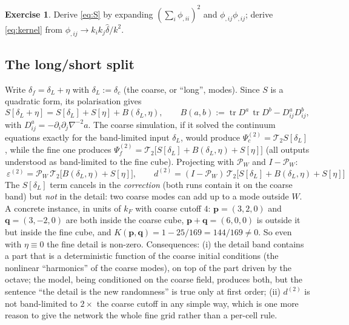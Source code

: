 \documentclass[11pt]{article}
\theoremstyle{definition}
\newtheorem{exercise}[proposition]{Exercise}
\newcommand{\PW}{\mathcal{P}_W}
\newcommand{\tr}{\operatorname{tr}}
\begin{document}
\begin{exercise}
Derive \eqref{eq:S} by expanding $(\sum_i\phi_{,ii})^2$ and $\phi_{,ij}\phi_{,ij}$; derive \eqref{eq:kernel} from $\phi_{,ij}\to k_ik_j\hat\delta/k^2$.
\end{exercise}

\subsection{The long/short split}

Write $\delta_f=\delta_L+\eta$ with $\delta_L:=\delta_c$ (the coarse, or ``long'', modes). Since $S$ is a quadratic form, its polarisation gives
\begin{equation}
S[\delta_L+\eta]=S[\delta_L]+S[\eta]+B(\delta_L,\eta),\qquad
B(a,b):=\tr D^{a}\,\tr D^{b}-D^{a}_{ij}D^{b}_{ij},
\label{eq:split}
\end{equation}
with $D^a_{ij}=-\partial_i\partial_j\nabla^{-2}a$. The coarse simulation, if it solved the continuum equations exactly for the band-limited input $\delta_L$, would produce $\Psi^{(2)}_c=\mathcal T_2S[\delta_L]$, while the fine one produces $\Psi^{(2)}_f=\mathcal T_2\big[S[\delta_L]+B(\delta_L,\eta)+S[\eta]\big]$ (all outputs understood as band-limited to the fine cube). Projecting with $\PW$ and $I-\PW$:
\begin{equation}
\boxed{\ \varepsilon^{(2)}=\PW\,\mathcal T_2\big[B(\delta_L,\eta)+S[\eta]\big],\qquad
d^{(2)}=(I-\PW)\,\mathcal T_2\big[S[\delta_L]+B(\delta_L,\eta)+S[\eta]\big]\ }
\label{eq:eps2}
\end{equation}
The $S[\delta_L]$ term cancels in the \emph{correction} (both runs contain it on the coarse band) but \emph{not} in the detail: two coarse modes can add up to a mode outside $W$. A concrete instance, in units of $k_F$ with coarse cutoff $4$: $\mathbf p=(3,2,0)$ and $\mathbf q=(3,-2,0)$ are both inside the coarse cube, $\mathbf p+\mathbf q=(6,0,0)$ is outside it but inside the fine cube, and $K(\mathbf p,\mathbf q)=1-25/169=144/169\neq0$. So even with $\eta\equiv0$ the fine detail is non-zero. Consequences: (i) the detail band contains a part that is a deterministic function of the coarse initial conditions (the nonlinear ``harmonics'' of the coarse modes), on top of the part driven by the octave; the model, being conditioned on the coarse field, produces both, but the sentence ``the detail is the new randomness'' is true only at first order; (ii) $d^{(2)}$ is not band-limited to $2\times$ the coarse cutoff in any simple way, which is one more reason to give the network the whole fine grid rather than a per-cell rule.
\end{document}

